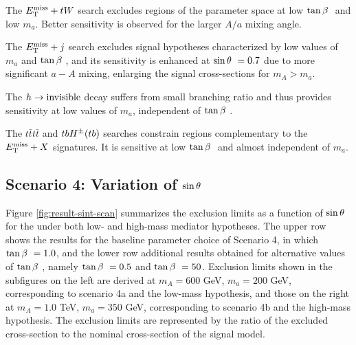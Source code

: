 The $E_{\mathrm{T}}^{\mathrm{miss}}+tW$ search excludes regions of the parameter space at low $\tan\beta~$ and low $m_a$. Better sensitivity is observed for the larger $A/a$ mixing angle. 

The $E_{\mathrm{T}}^{\mathrm{miss}}+j$ search excludes signal hypotheses characterized by low values of $m_a$ and $\tan\beta~$, and its sensitivity is enhanced at $\sin\theta~=0.7$ due to more significant $a-A$ mixing, enlarging the signal cross-sections for $m_A>m_a$. 

The $h\rightarrow \mathrm{invisible}$ decay suffers from small branching ratio and thus provides sensitivity at low values of $m_a$, independent of $\tan\beta~$.

The $t\bar{t}t\bar{t}$ and $tbH^{\pm}(tb)$ searches constrain regions complementary to the $E_{\mathrm{T}}^{\mathrm{miss}}+X$ signatures. It is sensitive at low $\tan\beta~$ and almost independent of $m_a$.

\subsection{Scenario 4: Variation of \texorpdfstring{$\sin\theta~$}{TEXT}}

Figure \ref{fig:result-sint-scan} summarizes the exclusion limits as a function of $\sin\theta~$ for the \thdma under both low- and high-mass mediator hypotheses. The upper row shows the results for the baseline parameter choice of Scenario 4, in which $\tan\beta~=1.0$, and the lower row additional results obtained for alternative values of $\tan\beta~$, namely $\tan\beta~=0.5$ and $\tan\beta~=50$. Exclusion limits shown in the subfigures on the left are derived at $m_A=600$ GeV, $m_a=200$ GeV, corresponding to scenario 4a and the low-mass hypothesis, and those on the right at $m_A=1.0$ TeV, $m_a=350$ GeV, corresponding to scenario 4b and the high-mass hypothesis. The exclusion limits are represented by the ratio of the excluded cross-section to the nominal cross-section of the signal model.

